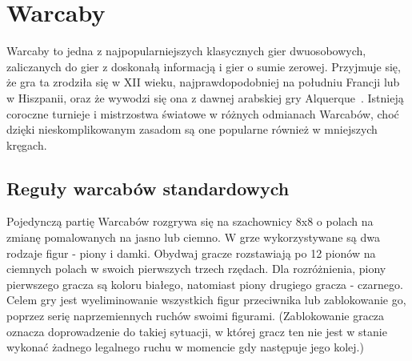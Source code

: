 \chapter{Warcaby}
\thispagestyle{chapterBeginStyle}
\label{rozdzial1}



Warcaby to jedna z najpopularniejszych klasycznych gier dwuosobowych, zaliczanych do gier z doskonałą informacją i gier o sumie zerowej. Przyjmuje się, że gra ta zrodziła się w XII wieku, najprawdopodobniej na południu Francji lub w Hiszpanii, oraz że wywodzi się ona z dawnej arabskiej gry Alquerque~\cite{Gry}. Istnieją coroczne turnieje i mistrzostwa światowe w różnych odmianach Warcabów, choć dzięki nieskomplikowanym zasadom są one popularne również w mniejszych kręgach.

\section{Reguły warcabów standardowych}

Pojedynczą partię Warcabów rozgrywa się na szachownicy 8x8 o polach na zmianę pomalowanych na jasno lub ciemno. W grze wykorzystywane są dwa rodzaje figur - piony i damki. Obydwaj gracze rozstawiają po 12 pionów na ciemnych polach w swoich pierwszych trzech rzędach. Dla rozróżnienia, piony pierwszego gracza są koloru białego, natomiast piony drugiego gracza - czarnego. Celem gry jest wyeliminowanie wszystkich figur przeciwnika lub zablokowanie go, poprzez serię naprzemiennych ruchów swoimi figurami. (Zablokowanie gracza oznacza doprowadzenie do takiej sytuacji, w której gracz ten nie jest w stanie wykonać żadnego legalnego ruchu w momencie gdy następuje jego kolej.)

\FloatBarrier


